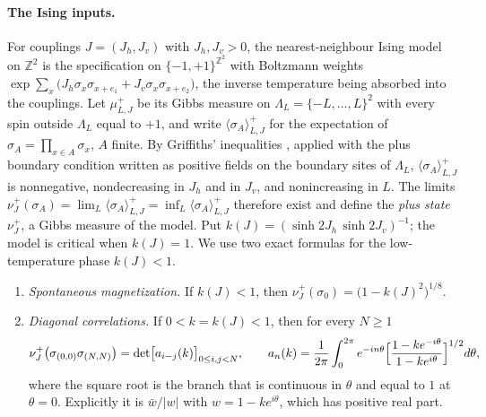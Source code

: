 \documentclass[11pt]{article}
\theoremstyle{plain}
\theoremstyle{definition}
\theoremstyle{remark}
\newcommand{\Z}{\mathbb{Z}}
\newcommand{\Lam}{\Lambda}
\begin{document}
\paragraph{The Ising inputs.} For couplings $J=(J_h,J_v)$ with $J_h,J_v>0$, the nearest-neighbour Ising model on $\Z^2$ is the specification on $\{-1,+1\}^{\Z^2}$ with Boltzmann weights $\exp\sum_x\bigl(J_h\sigma_x\sigma_{x+e_1}+J_v\sigma_x\sigma_{x+e_2}\bigr)$, the inverse temperature being absorbed into the couplings. Let $\mu^+_{L,J}$ be its Gibbs measure on $\Lam_L=\{-L,\dots,L\}^2$ with every spin outside $\Lam_L$ equal to $+1$, and write $\langle\sigma_A\rangle^+_{L,J}$ for the expectation of $\sigma_A=\prod_{x\in A}\sigma_x$, $A$ finite. By Griffiths' inequalities \cite{Gri67,KS68}, applied with the plus boundary condition written as positive fields on the boundary sites of $\Lam_L$, $\langle\sigma_A\rangle^+_{L,J}$ is nonnegative, nondecreasing in $J_h$ and in $J_v$, and nonincreasing in $L$. The limits $\nu^+_J(\sigma_A)=\lim_L\langle\sigma_A\rangle^+_{L,J}=\inf_L\langle\sigma_A\rangle^+_{L,J}$ therefore exist and define the \emph{plus state} $\nu^+_J$, a Gibbs measure of the model. Put $k(J)=(\sinh2J_h\,\sinh2J_v)^{-1}$; the model is critical when $k(J)=1$. We use two exact formulas for the low-temperature phase $k(J)<1$.
\begin{enumerate}[label=(I\arabic*)]
\item\label{I1} \emph{Spontaneous magnetization.} If $k(J)<1$, then $\nu^+_J(\sigma_0)=\bigl(1-k(J)^2\bigr)^{1/8}$.
\item\label{I2} \emph{Diagonal correlations.} If $0<k=k(J)<1$, then for every $N\ge1$
\[
\nu^+_J\bigl(\sigma_{(0,0)}\sigma_{(N,N)}\bigr)=\det\bigl[a_{i-j}(k)\bigr]_{0\le i,j<N},\qquad a_n(k)=\frac1{2\pi}\int_0^{2\pi}e^{-in\theta}\Bigl[\frac{1-ke^{-i\theta}}{1-ke^{i\theta}}\Bigr]^{1/2}d\theta,
\]
where the square root is the branch that is continuous in $\theta$ and equal to $1$ at $\theta=0$. Explicitly it is $\bar w/|w|$ with $w=1-ke^{i\theta}$, which has positive real part.
\end{enumerate}
\end{document}
